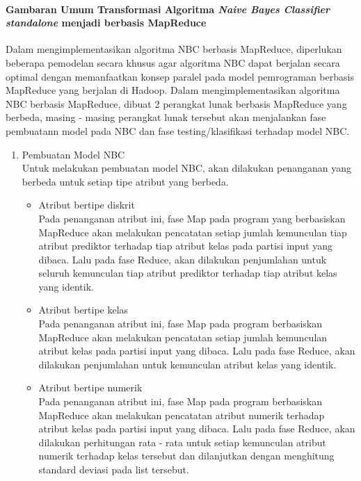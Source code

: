 \paragraph{Gambaran Umum Transformasi Algoritma \textit{Naive Bayes Classifier standalone} menjadi berbasis MapReduce}

Dalam mengimplementasikan algoritma NBC berbasis MapReduce, diperlukan beberapa pemodelan secara khusus agar algoritma NBC dapat berjalan secara optimal dengan memanfaatkan konsep paralel pada model pemrograman berbasis MapReduce yang berjalan di Hadoop. Dalam mengimplementasikan algoritma NBC berbasis MapReduce, dibuat 2 perangkat lunak berbasis MapReduce yang berbeda, masing - masing perangkat lunak tersebut akan menjalankan fase pembuatann model pada NBC dan fase testing/klasifikasi terhadap model NBC.
\begin{enumerate}
	\item Pembuatan Model NBC\\
	Untuk melakukan pembuatan model NBC, akan dilakukan penanganan yang berbeda untuk setiap tipe atribut yang berbeda.
	\begin{itemize}
		\item Atribut bertipe diskrit\\
		Pada penanganan atribut ini, fase Map pada program yang berbasiskan MapReduce akan melakukan pencatatan setiap jumlah kemunculan tiap atribut prediktor terhadap tiap atribut kelas pada partisi input yang dibaca. Lalu pada fase Reduce, akan dilakukan penjumlahan untuk seluruh kemunculan tiap atribut prediktor terhadap tiap atribut kelas yang identik.
		\item Atribut bertipe kelas\\
		Pada penanganan atribut ini, fase Map pada program berbasiskan MapReduce akan melakukan pencatatan setiap jumlah kemunculan atribut kelas pada partisi input yang dibaca. Lalu pada fase Reduce, akan dilakukan penjumlahan untuk kemunculan atribut kelas yang identik.
		\item Atribut bertipe numerik\\
		Pada penanganan atribut ini, fase Map pada program berbasiskan MapReduce akan melakukan pencatatan atribut numerik terhadap atribut kelas pada partisi input yang dibaca. Lalu pada fase Reduce, akan dilakukan perhitungan rata - rata untuk setiap kemunculan atribut numerik terhadap kelas tersebut dan dilanjutkan dengan menghitung standard deviasi pada list tersebut.
	\end{itemize}
	

\end{enumerate}
